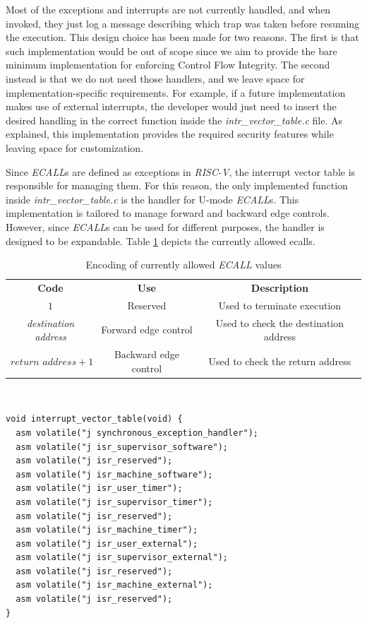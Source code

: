 Most of the exceptions and interrupts are not currently handled, and when invoked,
they just log a message describing which trap was taken before resuming the
execution. This design choice has been made for two reasons. The first is that
such implementation would be out of scope since we aim to provide the bare
minimum implementation for enforcing Control Flow Integrity. The second instead is
that we do not need those handlers, and we leave space for implementation-specific
requirements. For example, if a future implementation makes use of external
interrupts, the developer would just need to insert the desired handling in the correct
function inside the \textit{intr\_vector\_table.c} file. As explained, this
implementation provides the required security features while leaving space for
customization.

Since \textit{ECALL}s are defined as exceptions in \textit{RISC-V}, the
interrupt vector table is responsible for managing them. For this reason, the
only implemented function inside \textit{intr\_vector\_table.c} is the handler for
U-mode \textit{ECALL}s. This implementation is tailored to manage forward and
backward edge controls. However, since \textit{ECALL}s can be used for different
purposes, the handler is designed to be expandable. Table \ref{tab:ecalls}
depicts the currently allowed ecalls.
\begin{table}
  \centering
  \begin{tabular}{|c|c|c|}
    \hline
    \textbf{Code}                & \textbf{Use}          & \textbf{Description}                  \\
    \hhline{===} $1$             & Reserved              & Used to terminate execution           \\
    \hline
    \textit{destination address} & Forward edge control  & Used to check the destination address \\
    \hline
    $\textit{return address}+ 1$ & Backward edge control & Used to check the return address      \\
    \hline
  \end{tabular}
  \caption{Encoding of currently allowed \textit{ECALL} values}
  \label{tab:ecalls}
\end{table}
\\ \begin{lstlisting}[style=CStyle, caption = Interrput Vector Table, label={lst:intrtable}]
void interrupt_vector_table(void) {
  asm volatile("j synchronous_exception_handler");
  asm volatile("j isr_supervisor_software");
  asm volatile("j isr_reserved");
  asm volatile("j isr_machine_software");
  asm volatile("j isr_user_timer");
  asm volatile("j isr_supervisor_timer");
  asm volatile("j isr_reserved");
  asm volatile("j isr_machine_timer");
  asm volatile("j isr_user_external");
  asm volatile("j isr_supervisor_external");
  asm volatile("j isr_reserved");
  asm volatile("j isr_machine_external");
  asm volatile("j isr_reserved");
}
\end{lstlisting}

